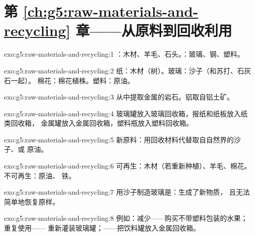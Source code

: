 \section*{第 \ref{ch:g5:raw-materials-and-recycling} 章——从原料到回收利用}

\begin{solution}{exo:g5:raw-materials-and-recycling:1}
：木材、羊毛、石头。：玻璃、钢、塑料。
\end{solution}

\begin{solution}{exo:g5:raw-materials-and-recycling:2}
纸：木材（树）。玻璃：沙子（和苏打、石灰石一起）。
棉花：棉花植株。塑料：原油。
\end{solution}

\begin{solution}{exo:g5:raw-materials-and-recycling:3}
从中提取金属的岩石。铝取自铝土矿。
\end{solution}

\begin{solution}{exo:g5:raw-materials-and-recycling:4}
玻璃罐放入玻璃回收箱，报纸和纸板放入纸类回收箱，
金属罐放入金属回收箱，塑料瓶放入塑料回收箱。
\end{solution}

\begin{solution}{exo:g5:raw-materials-and-recycling:5}
新原料：用回收材料代替取自自然界的沙子、或
原油。
\end{solution}

\begin{solution}{exo:g5:raw-materials-and-recycling:6}
可再生：木材（若重新种植）、羊毛、棉花。不可再生：原油、
铁。
\end{solution}

\begin{solution}{exo:g5:raw-materials-and-recycling:7}
用沙子制造玻璃是：生成了新物质，
且无法简单地恢复原样。
\end{solution}

\begin{solution}{exo:g5:raw-materials-and-recycling:8}
例如：减少——购买不带塑料包装的水果；重复使用——
重新灌装玻璃罐；——把饮料罐放入金属回收箱。
\end{solution}

